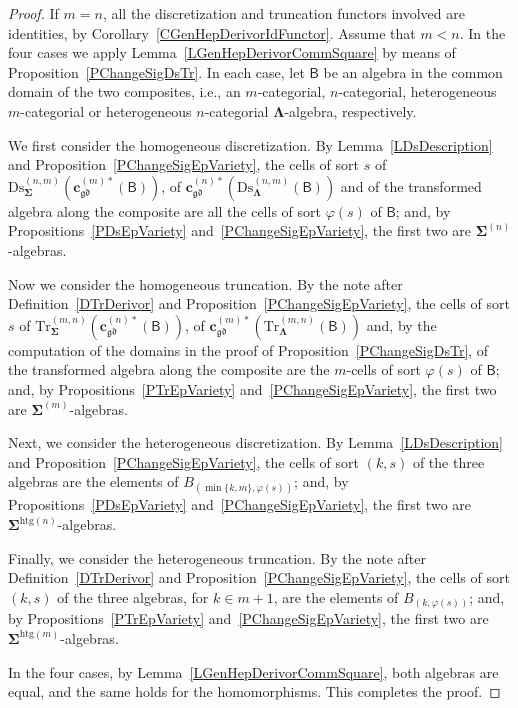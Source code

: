 \documentclass[a4paper, reqno]{amsbook}
\newcommand{\sig}[1]{\mathbf{#1}}             %
\newcommand{\calg}[1]{\boldsymbol{\mathsf{#1}}} %
\newcommand{\gd}{\mathfrak{gd}}              %
\newcommand{\htg}{\mathrm{htg}}                %
\newcommand{\Ds}{\mathrm{Ds}}
\newcommand{\Tr}{\mathrm{Tr}}
\theoremstyle{plain}
\theoremstyle{definition}
\begin{document}
\begin{proof}
If $m=n$, all the discretization and truncation functors involved are identities, by Corollary~\ref{CGenHepDerivorIdFunctor}.
Assume that $m<n$.
In the four cases we apply Lemma~\ref{LGenHepDerivorCommSquare} by means of Proposition~\ref{PChangeSigDsTr}.
In each case, let $\calg{B}$ be an algebra in the common domain of the two composites, i.e., an $m$-categorial, $n$-categorial, heterogeneous $m$-categorial or heterogeneous $n$-categorial $\sig{\Lambda}$-algebra, respectively.

We first consider the homogeneous discretization.
By Lemma~\ref{LDsDescription} and Proposition~\ref{PChangeSigEpVariety}, the cells of sort $s$ of $\Ds^{(n,m)}_{\sig{\Sigma}}(\mathbf{c}^{(m)\ast}_{\gd}(\calg{B}))$, of $\mathbf{c}^{(n)\ast}_{\gd}(\Ds^{(n,m)}_{\sig{\Lambda}}(\calg{B}))$ and of the transformed algebra along the composite are all the cells of sort $\varphi(s)$ of $\calg{B}$; and, by Propositions~\ref{PDsEpVariety} and~\ref{PChangeSigEpVariety}, the first two are $\sig{\Sigma}^{(n)}$-algebras.

Now we consider the homogeneous truncation.
By the note after Definition~\ref{DTrDerivor} and Proposition~\ref{PChangeSigEpVariety}, the cells of sort $s$ of $\Tr^{(m,n)}_{\sig{\Sigma}}(\mathbf{c}^{(n)\ast}_{\gd}(\calg{B}))$, of $\mathbf{c}^{(m)\ast}_{\gd}(\Tr^{(m,n)}_{\sig{\Lambda}}(\calg{B}))$ and, by the computation of the domains in the proof of Proposition~\ref{PChangeSigDsTr}, of the transformed algebra along the composite are the $m$-cells of sort $\varphi(s)$ of $\calg{B}$; and, by Propositions~\ref{PTrEpVariety} and~\ref{PChangeSigEpVariety}, the first two are $\sig{\Sigma}^{(m)}$-algebras.

Next, we consider the heterogeneous discretization.
By Lemma~\ref{LDsDescription} and Proposition~\ref{PChangeSigEpVariety}, the cells of sort $(k,s)$ of the three algebras are the elements of $B_{(\min\{k,m\},\varphi(s))}$; and, by Propositions~\ref{PDsEpVariety} and~\ref{PChangeSigEpVariety}, the first two are $\sig{\Sigma}^{\htg(n)}$-algebras.

Finally, we consider the heterogeneous truncation.
By the note after Definition~\ref{DTrDerivor} and Proposition~\ref{PChangeSigEpVariety}, the cells of sort $(k,s)$ of the three algebras, for $k\in m+1$, are the elements of $B_{(k,\varphi(s))}$; and, by Propositions~\ref{PTrEpVariety} and~\ref{PChangeSigEpVariety}, the first two are $\sig{\Sigma}^{\htg(m)}$-algebras.

In the four cases, by Lemma~\ref{LGenHepDerivorCommSquare}, both algebras are equal, and the same holds for the homomorphisms. This completes the proof.
\end{proof}
\end{document}
